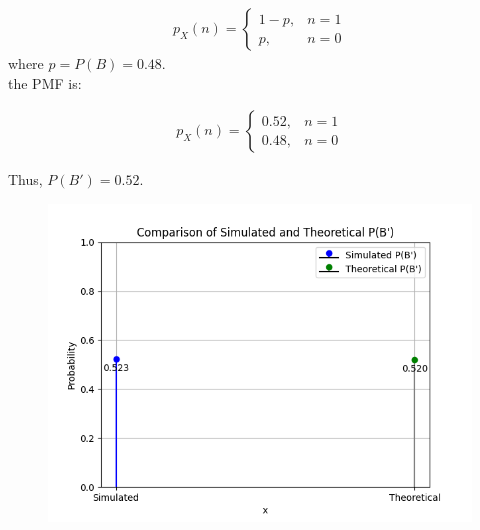 \documentclass[journal]{IEEEtran}
\begin{document}
\begin{align}
p_{X}(n) =
\begin{cases}
1 - p ,& n = 1\\
p ,& n = 0
\end{cases}
\end{align}
where \( p = P(B) = 0.48 \).\\
the PMF is:

\begin{align}
p_{X}(n) =
\begin{cases}
0.52 ,& n = 1 \\
0.48 ,& n = 0
\end{cases}
\end{align}

Thus, \( P(B') = 0.52 \).

\begin{figure}[h!]
   \centering
   \includegraphics[width=\columnwidth]{figs/fig.pdf}
\end{figure}
\end{document}
